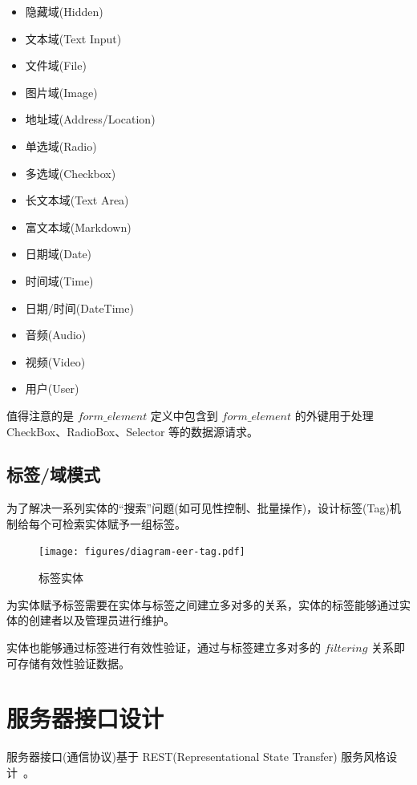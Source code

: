 \begin{itemize}
  \item 隐藏域(Hidden)
  \item 文本域(Text Input)
  \item 文件域(File)
  \item 图片域(Image)
  \item 地址域(Address/Location)
  \item 单选域(Radio)
  \item 多选域(Checkbox)
  \item 长文本域(Text Area)
  \item 富文本域(Markdown)
  \item 日期域(Date)
  \item 时间域(Time)
  \item 日期/时间(DateTime)
  \item 音频(Audio)
  \item 视频(Video)
  \item 用户(User)
\end{itemize}

值得注意的是 $form\_element$ 定义中包含到 $form\_element$ 的外键用于处理 CheckBox、RadioBox、Selector 等的数据源请求。

\subsection{标签/域模式}

为了解决一系列实体的“搜索”问题(如可见性控制、批量操作)，设计标签(Tag)机制给每个可检索实体赋予一组标签。

\begin{figure}[!h]
  \begin{center}
    \texttt{[image: figures/diagram-eer-tag.pdf]}
    \caption{标签实体\label{DatabaseEntityTag}}
  \end{center}
\end{figure}

为实体赋予标签需要在实体与标签之间建立多对多的关系，实体的标签能够通过实体的创建者以及管理员进行维护。

实体也能够通过标签进行有效性验证，通过与标签建立多对多的 $filtering$ 关系即可存储有效性验证数据。

\newpage

\section{服务器接口设计\label{sec:ServerAPI}}

服务器接口(通信协议)基于 REST(Representational State Transfer) 服务风格设计~\cite{fielding2002principled}。

